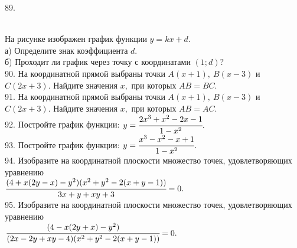 \documentclass[12pt]{article}
\begin{document}
89. \begin{figure}[ht!]
\end{figure}\\
На рисунке изображен график функции $y=kx+d.$\\
а) Определите знак коэффициента $d.$\\
б) Проходит ли график через точку с координатами $(1; d) ?$\\
90. На координатной прямой выбраны точки $A(x + 1),\ B(x - 3)$ и $C(2x + 3).$ Найдите значения $x,$ при которых $AB = BC.$\\
91. На координатной прямой выбраны точки $A(x + 1),\ B(x - 3)$ и $C(2x + 3).$ Найдите значения $x,$ при которых $AB = AC.$\\
92. Постройте график функции: $y=\cfrac{2x^3+x^2-2x-1}{1-x^2}.$\\
93. Постройте график функции: $y=\cfrac{x^3-x^2-x+1}{1-x^2}.$\\
94. Изобразите на координатной плоскости множество точек, удовлетворяющих уравнению \\$\cfrac{(4+x(2y-x)-y^2)(x^2+y^2-2(x+y-1))}{3x+y+xy+3}=0.$\\
95. Изобразите на координатной плоскости множество точек, удовлетворяющих уравнению \\ $\cfrac{(4-x(2y+x)-y^2)}{(2x-2y+xy-4)(x^2+y^2-2(x+y-1))}=0.$
\newpage
\end{document}
